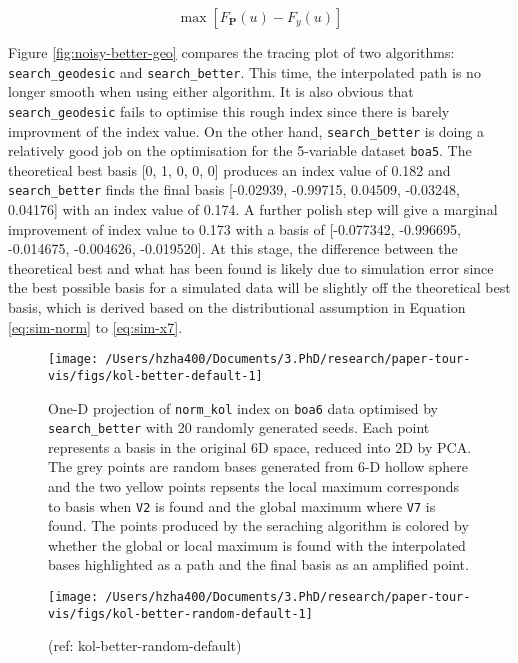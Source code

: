 \documentclass[12pt]{article}
\begin{document}
\[\max \left[F_{\mathbf{P}}(u) - F_{y}(u)\right]\]

Figure \ref{fig:noisy-better-geo} compares the tracing plot of two algorithms: \texttt{search\_geodesic} and \texttt{search\_better}. This time, the interpolated path is no longer smooth when using either algorithm. It is also obvious that \texttt{search\_geodesic} fails to optimise this rough index since there is barely improvment of the index value. On the other hand, \texttt{search\_better} is doing a relatively good job on the optimisation for the 5-variable dataset \texttt{boa5}. The theoretical best basis {[}0, 1, 0, 0, 0{]} produces an index value of 0.182 and \texttt{search\_better} finds the final basis {[}-0.02939, -0.99715, 0.04509, -0.03248, 0.04176{]} with an index value of 0.174. A further polish step will give a marginal improvement of index value to 0.173 with a basis of {[}-0.077342, -0.996695, -0.014675, -0.004626, -0.019520{]}. At this stage, the difference between the theoretical best and what has been found is likely due to simulation error since the best possible basis for a simulated data will be slightly off the theoretical best basis, which is derived based on the distributional assumption in Equation \ref{eq:sim-norm} to \ref{eq:sim-x7}.

\begin{figure}

{\centering \texttt{[image: /Users/hzha400/Documents/3.PhD/research/paper-tour-vis/figs/kol-better-default-1]} 

}

\caption{One-D projection of \texttt{norm\_kol} index on \texttt{boa6} data optimised by \texttt{search\_better} with 20 randomly generated seeds. Each point represents a basis in the original 6D space, reduced into 2D by PCA. The grey points are random bases generated from 6-D hollow sphere and the two yellow points repsents the local maximum corresponds to basis when \texttt{V2} is found and the global maximum where \texttt{V7} is found. The points produced by the seraching algorithm is colored by whether the global or local maximum is found with the interpolated bases highlighted as a path and the final basis as an amplified point.}\label{fig:kol-better-default}
\end{figure}



\begin{figure}

{\centering \texttt{[image: /Users/hzha400/Documents/3.PhD/research/paper-tour-vis/figs/kol-better-random-default-1]} 

}

\caption{(ref: kol-better-random-default)}\label{fig:kol-better-random-default}
\end{figure}
\end{document}
